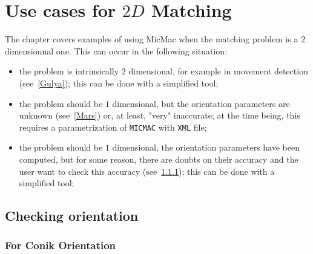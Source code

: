 \chapter{Use cases for $2D$ Matching}

The chapter covers examples of using MicMac when the matching problem is
a $2$ dimensionnal one. This can occur in the following situation:


\begin{itemize}
   \item the problem is intrinsically $2$ dimensional, for example in
         movement detection (see~\ref{Gulya}); this can be done with a simplified tool;

   \item the problem should be $1$ dimensional, but the orientation parameters
         are unknown (see~\ref{Mars}) or, at least, "very" inaccurate; at the time being,
         this requires a parametrization of {\tt MICMAC} with {\tt XML} file;

   \item the problem should be $1$ dimensional, the orientation parameters have been computed,
         but for some reason, there are doubts on their accuracy and the user want to check
         this accuracy (see~\ref{CheckOri});  this can be done with a simplified tool;
\end{itemize}



\section{Checking orientation}

\subsection{For Conik Orientation}
\label{CheckOri}

